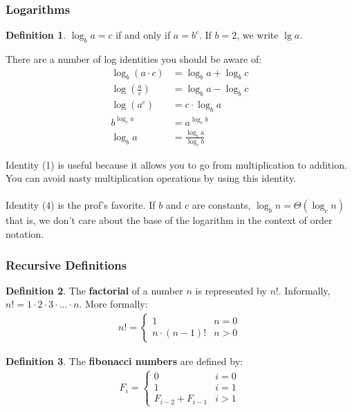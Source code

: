 \documentclass[]{article}
\theoremstyle{definition}
\newtheorem*{defn}{Definition}
\begin{document}
			\subsubsection{Logarithms}
				\begin{defn}
					$\log_b a = c$ if and only if $a = b^c$. If $b = 2$, we write $\lg a$.
				\end{defn}

				There are a number of log identities you should be aware of:
				\begin{align}
					\log_b (a \cdot c) &= \log_b a + \log_b c \\
					\log \left( \frac{a}{c} \right) &= \log_b a - \log_b c \\
					\log(a^c) &= c \cdot \log_b a \\
					b^{\log_c a} &= a^{\log_c b} \\
					\log_b a &= \frac{\log_c a}{\log_c b}
				\end{align}

				Identity (1) is useful because it allows you to go from multiplication to addition. You can avoid nasty multiplication operations by using this identity.
				\\ \\
				Identity (4) is the prof's favorite. If $b$ and $c$ are constants, $\log_b n = \Theta(\log_c n)$ \textendash{} that is, we don't care about the base of the logarithm in the context of order notation.
			\subsubsection{Recursive Definitions}
				\begin{defn}
					The \textbf{factorial} of a number $n$ is represented by $n!$. Informally, $n! = 1 \cdot 2 \cdot 3 \cdot \ldots \cdot n$. More formally:
					\begin{align*}
						n! = \begin{cases}
							1 & n = 0 \\
							n \cdot (n - 1)! & n > 0
						\end{cases}
					\end{align*}
				\end{defn}

				\begin{defn}
					The \textbf{fibonacci numbers} are defined by:
					\begin{align*}
						F_i = \begin{cases}
							0 & i = 0 \\
							1 & i = 1 \\
							F_{i - 2} + F_{i - 1} & i > 1
						\end{cases}
					\end{align*}
				\end{defn}
\end{document}
